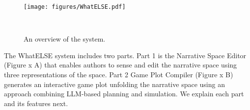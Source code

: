 \begin{figure*}[t]
\centering
\texttt{[image: figures/WhatELSE.pdf]}
\vspace{-10pt}
\caption{An overview of the system.}
~\label{overview}
\vspace{-10pt}
\end{figure*}





The WhatELSE system includes two parts. Part 1 is the {Narrative Space Editor} (Figure x A) that enables authors to sense and edit the narrative space using three representations of the space. Part 2 {Game Plot Compiler} (Figure x B)  generates an interactive game plot unfolding the narrative space using an approach combining LLM-based planning and simulation. We explain each part and its features next.









